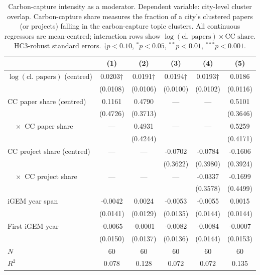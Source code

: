 \begin{table}[htbp]
\centering
\caption{Carbon-capture intensity as a moderator. Dependent variable: city-level cluster overlap. Carbon-capture share measures the fraction of a city's clustered papers (or projects) falling in the carbon-capture topic clusters. All continuous regressors are mean-centred; interaction rows show $\log(\text{cl.\ papers}) \times \text{CC share}$. HC3-robust standard errors. $\dagger p<0.10$, $^{*}p<0.05$, $^{**}p<0.01$, $^{***}p<0.001$.}
\label{tab:cc_moderator}
\begin{tabular}{lccccc}
\toprule
& (1) & (2) & (3) & (4) & (5) \\
\midrule
$\log(\text{cl.\ papers})$ (centred) & 0.0203$\dagger$ & 0.0191$\dagger$ & 0.0194$\dagger$ & 0.0193$\dagger$ & 0.0186 \\
& (0.0108) & (0.0106) & (0.0100) & (0.0102) & (0.0116) \\[4pt]
CC paper share (centred) & 0.1161 & 0.4790 & — & — & 0.5101 \\
& (0.4726) & (0.3713) &  &  & (0.3646) \\[4pt]
$\quad \times$ CC paper share & — & 0.4931 & — & — & 0.5259 \\
&  & (0.4244) &  &  & (0.4171) \\[4pt]
CC project share (centred) & — & — & -0.0702 & -0.0784 & -0.1606 \\
&  &  & (0.3622) & (0.3980) & (0.3924) \\[4pt]
$\quad \times$ CC project share & — & — & — & -0.0337 & -0.1699 \\
&  &  &  & (0.3578) & (0.4499) \\[4pt]
iGEM year span & -0.0042 & 0.0024 & -0.0053 & -0.0055 & 0.0015 \\
& (0.0141) & (0.0129) & (0.0135) & (0.0144) & (0.0144) \\[4pt]
First iGEM year & -0.0065 & -0.0001 & -0.0082 & -0.0084 & -0.0007 \\
& (0.0150) & (0.0137) & (0.0136) & (0.0144) & (0.0153) \\[4pt]
\midrule
$N$ & 60 & 60 & 60 & 60 & 60 \\
$R^2$ & 0.078 & 0.128 & 0.072 & 0.072 & 0.135 \\
\bottomrule
\end{tabular}
\end{table}